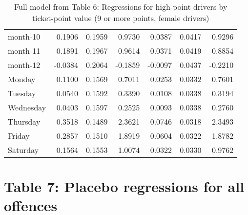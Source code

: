 \documentclass[10pt]{article}
\begin{document}
\begin{table}[ht]
\begin{tabular}{lrrrrrr}
  month-10 & 0.1906 & 0.1959 & 0.9730 & 0.0387 & 0.0417 & 0.9296 \\ 
  month-11 & 0.1891 & 0.1967 & 0.9614 & 0.0371 & 0.0419 & 0.8854 \\ 
  month-12 & -0.0384 & 0.2064 & -0.1859 & -0.0097 & 0.0437 & -0.2210 \\ 
  Monday & 0.1100 & 0.1569 & 0.7011 & 0.0253 & 0.0332 & 0.7601 \\ 
  Tuesday & 0.0540 & 0.1592 & 0.3390 & 0.0108 & 0.0338 & 0.3194 \\ 
  Wednesday & 0.0403 & 0.1597 & 0.2525 & 0.0093 & 0.0338 & 0.2760 \\ 
  Thursday & 0.3518 & 0.1489 & 2.3621 & 0.0746 & 0.0318 & 2.3493 \\ 
  Friday & 0.2857 & 0.1510 & 1.8919 & 0.0604 & 0.0322 & 1.8782 \\ 
  Saturday & 0.1564 & 0.1553 & 1.0074 & 0.0322 & 0.0330 & 0.9762 \\ 
   \hline
\end{tabular}
\caption{Full model from Table 6: Regressions for high-point drivers by ticket-point value (9 or more points, female drivers)} 
\label{tab_6_9plus_pts_no_age_F}
\end{table}


\clearpage
\pagebreak




\section{Table 7: Placebo regressions for all offences}



\end{document}
